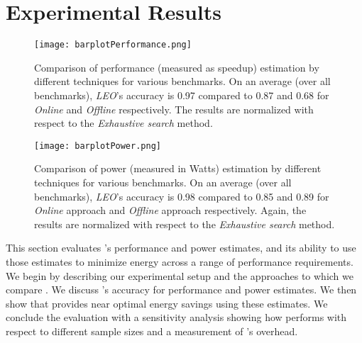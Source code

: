 \section{Experimental Results}
\label{sec:experiment}
\begin{figure*}
\begin{center}
 \texttt{[image: barplotPerformance.png]}
 \vspace{-0.35em}
 \caption{Comparison of performance (measured as speedup) estimation
   by different techniques for various benchmarks.    On an average
   (over all benchmarks), \textit{LEO}'s accuracy is 0.97 compared to
   0.87 and 0.68 for \textit{Online} and \textit{Offline}
   respectively. The results are normalized with respect to the
   \textit{Exhaustive search} method.  }
\label{fig:barperf}
\end{center}
\end{figure*}
\begin{figure*}
\begin{center}
 \texttt{[image: barplotPower.png]}
 \vspace{-0.35em}
 \caption{Comparison of power (measured in Watts) estimation by
   different techniques for various benchmarks.  On an average (over all benchmarks),
   \textit{LEO}'s accuracy is 0.98 compared to 0.85 and 0.89 for
   \textit{Online} approach and \textit{Offline} approach
   respectively. Again, the results are normalized with respect to the
   \textit{Exhaustive search} method.}
\label{fig:barpower}
\end{center}
\end{figure*}



This section evaluates \SYSTEMLEO{}'s performance and power estimates,
and its ability to use those estimates to minimize energy across a
range of performance requirements.  We begin by describing our
experimental setup and the approaches to which we compare \SYSTEMLEO{}.
We discuss \SYSTEMLEO{}'s accuracy for performance and power estimates.
We then show that \SYSTEMLEO{} provides near optimal energy savings using
these estimates.  We conclude the evaluation with a sensitivity
analysis showing how \SYSTEMLEO{} performs with respect to different
sample sizes and a measurement of \SYSTEMLEO{}'s overhead.

